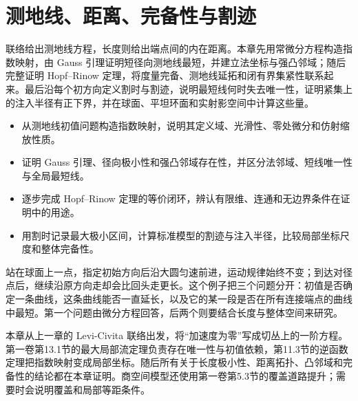 
% 
% 

\chapter{测地线、距离、完备性与割迹}
\label{g3:ch:02}

\begin{chapterabstract}
	联络给出测地线方程，长度则给出端点间的内在距离。本章先用常微分方程构造指数映射，由 Gauss 引理证明短径向测地线最短，并建立法坐标与强凸邻域；随后完整证明 Hopf--Rinow 定理，将度量完备、测地线延拓和闭有界集紧性联系起来。最后沿每个初方向定义割时与割迹，说明最短线何时失去唯一性，证明紧集上的注入半径有正下界，并在球面、平坦环面和实射影空间中计算这些量。
\end{chapterabstract}

\begin{learninggoals}
	\begin{itemize}
		\item 从测地线初值问题构造指数映射，说明其定义域、光滑性、零处微分和仿射缩放性质。
		\item 证明 Gauss 引理、径向极小性和强凸邻域存在性，并区分法邻域、短线唯一性与全局最短线。
		\item 逐步完成 Hopf--Rinow 定理的等价闭环，辨认有限维、连通和无边界条件在证明中的用途。
		\item 用割时记录最大极小区间，计算标准模型的割迹与注入半径，比较局部坐标尺度和整体完备性。
	\end{itemize}
\end{learninggoals}

站在球面上一点，指定初始方向后沿大圆匀速前进，运动规律始终不变；到达对径点后，继续沿原方向走却会比回头走更长。这个例子把三个问题分开：初值是否确定一条曲线，这条曲线能否一直延长，以及它的某一段是否在所有连接端点的曲线中最短。第一个问题由微分方程回答，后两个则要结合长度与整体空间来研究。

\ProseParagraphBreak

本章从上一章的 Levi-Civita 联络出发，将“加速度为零”写成切丛上的一阶方程。第一卷第13.1节的最大局部流定理负责存在唯一性与初值依赖，第11.3节的逆函数定理把指数映射变成局部坐标。随后所有关于长度极小性、距离拓扑、凸邻域和完备性的结论都在本章证明。商空间模型还使用第一卷第5.3节的覆盖道路提升；需要时会说明覆盖和局部等距条件。


